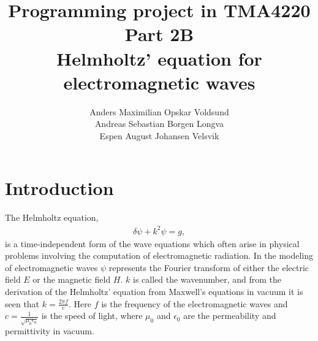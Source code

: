 \documentclass[10pt,a4paper]{article}
\begin{document}
\title{Programming project in TMA4220 \\ Part 2B \\ Helmholtz' equation for electromagnetic waves}
\author{Anders Maximilian Opskar Voldsund \\ Andreas Sebastian Borgen Longva \\ Espen August Johansen Velsvik}
\maketitle


\section*{Introduction}
The Helmholtz equation,
\begin{align}
\delta \psi + k^2 \psi = g,
\end{align}
is a time-independent form of the wave equations which often arise in physical problems involving the computation of electromagnetic radiation. In the modeling of electromagnetic waves $\psi$ represents the Fourier transform of either the electric field $E$ or the magnetic field $H$. $k$ is called the wavenumber, and from the derivation of the Helmholtz' equation from Maxwell's equations in vacuum it is seen that $k = \frac{2\pi f}{c}$. Here $f$ is the frequency of the electromagnetic waves and $c = \frac{1}{\sqrt{\mu_0 \epsilon_0}}$ is the speed of light, where $\mu_0$ and $\epsilon_0$ are the permeability and permittivity in vacuum.
\end{document}
